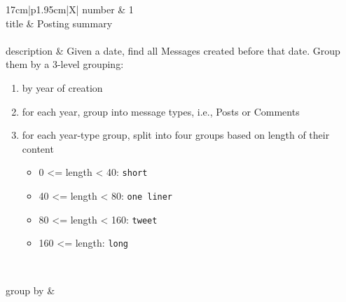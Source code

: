 \renewcommand*{\arraystretch}{1.1}

\noindent\begin{tabularx}{17cm}{|p{1.95cm}|X|}
	\hline
	number      & 1                                                          \\ \hline
%
	title       & Posting summary                                                           \\ \hline
	 \\ \hline
	description & Given a date, find all Messages created before that date. Group them by
a 3-level grouping:

\begin{enumerate}
\def\labelenumi{\arabic{enumi}.}
\tightlist
\item
  by year of creation
\item
  for each year, group into message types, i.e., Posts or Comments
\item
  for each year-type group, split into four groups based on length of
  their content

  \begin{itemize}
  \tightlist
  \item
    0 \textless{}= length \textless{} 40: \texttt{short}
  \item
    40 \textless{}= length \textless{} 80: \texttt{one\ liner}
  \item
    80 \textless{}= length \textless{} 160: \texttt{tweet}
  \item
    160 \textless{}= length: \texttt{long}
  \end{itemize}
\end{enumerate}
 \\ \hline
	
%
	group by       &
	 \\ \hline
	

\end{tabularx}
